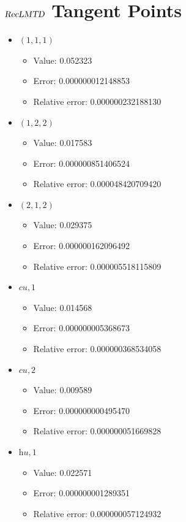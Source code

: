 \documentclass{article}%
\begin{document}
\section{$\textsl{RecLMTD}$ Tangent Points}%
\thispagestyle{plain}%
\begin{itemize}%
	\item $(1, 1, 1)$%
	\begin{itemize}%
		\item Value: 0.052323%
		\item Error: 0.000000012148853%
		\item Relative error: 0.000000232188130%
	\end{itemize}%
	\item $(1, 2, 2)$%
	\begin{itemize}%
		\item Value: 0.017583%
		\item Error: 0.000000851406524%
		\item Relative error: 0.000048420709420%
	\end{itemize}%
	\item $(2, 1, 2)$%
	\begin{itemize}%
		\item Value: 0.029375%
		\item Error: 0.000000162096492%
		\item Relative error: 0.000005518115809%
	\end{itemize}%
	\item $\textit{cu},1$%
	\begin{itemize}%
		\item Value: 0.014568%
		\item Error: 0.000000005368673%
		\item Relative error: 0.000000368534058%
	\end{itemize}%
	\item $\textit{cu},2$%
	\begin{itemize}%
		\item Value: 0.009589%
		\item Error: 0.000000000495470%
		\item Relative error: 0.000000051669828%
	\end{itemize}%
	\item $\textit{hu},1$%
	\begin{itemize}%
		\item Value: 0.022571%
		\item Error: 0.000000001289351%
		\item Relative error: 0.000000057124932%
	\end{itemize}%
\end{itemize}%
\end{document}
